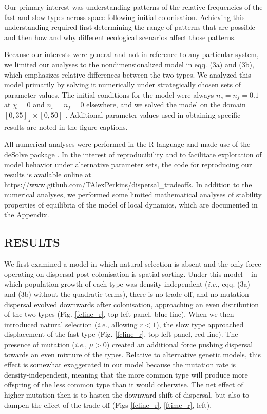 \documentclass[11pt]{article}
\newcommand{\ie}{{\em i.e.}, }
\begin{document}
Our primary interest was understanding patterns of the relative frequencies of the fast and slow types across space following initial colonisation. Achieving this understanding required first determining the range of patterns that are possible and then how and why different ecological scenarios affect those patterns.

Because our interests were general and not in reference to any particular system, we limited our analyses to the nondimensionalized model in eqq. (3a) and (3b), which emphasizes relative differences between the two types. We analyzed this model primarily by solving it numerically under strategically chosen sets of parameter values. The initial conditions for the model were always $n_s=n_f=0.1$ at $\chi=0$ and $n_s=n_f=0$ elsewhere, and we solved the model on the domain $[0,35]_\chi\times[0,50]_\tau$. Additional parameter values used in obtaining specific results are noted in the figure captions.

All numerical analyses were performed in the R language \citep{R} and made use of the deSolve package \citep{deSolve}. In the interest of reproducibility and to facilitate exploration of model behavior under alternative parameter sets, the code for reproducing our results is available online at https://www.github.com/TAlexPerkins/dispersal\_tradeoffs. In addition to the numerical analyses, we performed some limited mathematical analyses of stability properties of equilibria of the model of local dynamics, which are documented in the Appendix.


\subsection*{RESULTS}

We first examined a model in which natural selection is absent and the only force operating on dispersal post-colonisation is spatial sorting.  Under this model -- in which population growth of each type was density-independent (\ie eqq. (3a) and (3b) without the quadratic terms), there is no trade-off, and no mutation -- dispersal evolved downwards after colonisation, approaching an even distribution of the two types (Fig. \ref{fcline_r}, top left panel, blue line). When we then introduced natural selection (\ie allowing $r<1$), the slow type approached displacement of the fast type (Fig. \ref{fcline_r}, top left panel, red line). The presence of mutation (\ie $\mu>0$) created an additional force pushing dispersal towards an even mixture of the types. Relative to alternative genetic models, this effect is somewhat exaggerated in our model because the mutation rate is density-independent, meaning that the more common type will produce more offspring of the less common type than it would otherwise. The net effect of higher mutation then is to hasten the downward shift of dispersal, but also to dampen the effect of the trade-off (Figs \ref{fcline_r}, \ref{ftime_r}, left).
\end{document}
